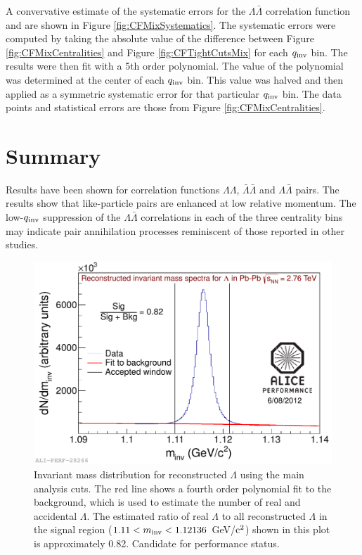 {A convervative estimate of the systematic errors for the $\Lambda\bar{\Lambda}$ correlation function and are shown in Figure \ref{fig:CFMixSystematics}.  The systematic errors were computed by taking the absolute value of the difference between Figure \ref{fig:CFMixCentralities} and Figure \ref{fig:CFTightCutsMix} for each $q_{\rm inv}$ bin.  The results were then fit with a 5th order polynomial.  The value of the polynomial was determined at the center of each $q_{\rm inv}$ bin.  This value was halved and then applied as a symmetric systematic error for that particular $q_{\rm inv}$ bin.  The data points and statistical errors are those from Figure \ref{fig:CFMixCentralities}.



\section{Summary}
Results have been shown for correlation functions $\Lambda\Lambda$, $\bar{\Lambda}\bar{\Lambda}$ and $\Lambda\bar{\Lambda}$ pairs.  The results show that like-particle pairs are enhanced at low relative momentum.  The low-$q_{\rm inv}$ suppression of the $\Lambda\bar{\Lambda}$ correlations in each of the three centrality bins may indicate pair annihilation processes reminiscent of those reported in other studies.

\begin{figure}[hbtp]
\includegraphics[scale=0.6]{2012-Aug-07-LamInvMass_Perf.pdf}
\caption[Invariant mass distribution for reconstructed $\Lambda$]{Invariant mass distribution for reconstructed $\Lambda$ using the main analysis cuts.  The red line shows a fourth order polynomial fit to the background, which is used to estimate the number of real and accidental $\Lambda$.  The estimated ratio of real $\Lambda$ to all reconstructed $\Lambda$ in the signal region ($ 1.11 < m_{\rm inv} < 1.12136$ GeV/${\rm c^2}$) shown in this plot is approximately 0.82.  Candidate for performance status.}
\label{fig:MassLooseCut}
\end{figure}

}

